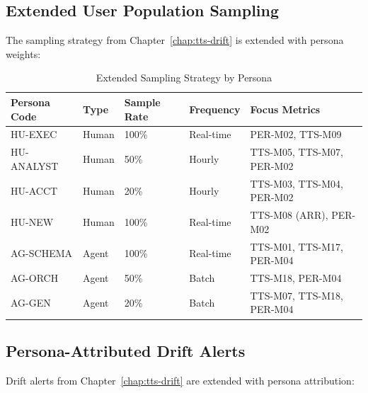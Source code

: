 \subsection{Extended User Population Sampling}

The sampling strategy from Chapter~\ref{chap:tts-drift} is extended with persona weights:

\begin{table}[htbp]
\centering
\footnotesize
\caption{Extended Sampling Strategy by Persona}
\label{tab:extended-sampling}
\begin{tabularx}{\textwidth}{@{}l l l l X@{}}
\toprule
\textbf{Persona Code} & \textbf{Type} & \textbf{Sample Rate} & \textbf{Frequency} & \textbf{Focus Metrics} \\
\midrule
HU-EXEC & Human & 100\% & Real-time & PER-M02, TTS-M09 \\
HU-ANALYST & Human & 50\% & Hourly & TTS-M05, TTS-M07, PER-M02 \\
HU-ACCT & Human & 20\% & Hourly & TTS-M03, TTS-M04, PER-M02 \\
HU-NEW & Human & 100\% & Real-time & TTS-M08 (ARR), PER-M02 \\
AG-SCHEMA & Agent & 100\% & Real-time & TTS-M01, TTS-M17, PER-M04 \\
AG-ORCH & Agent & 50\% & Batch & TTS-M18, PER-M04 \\
AG-GEN & Agent & 20\% & Batch & TTS-M07, TTS-M18, PER-M04 \\
\bottomrule
\end{tabularx}
\end{table}

\subsection{Persona-Attributed Drift Alerts}

Drift alerts from Chapter~\ref{chap:tts-drift} are extended with persona attribution:

